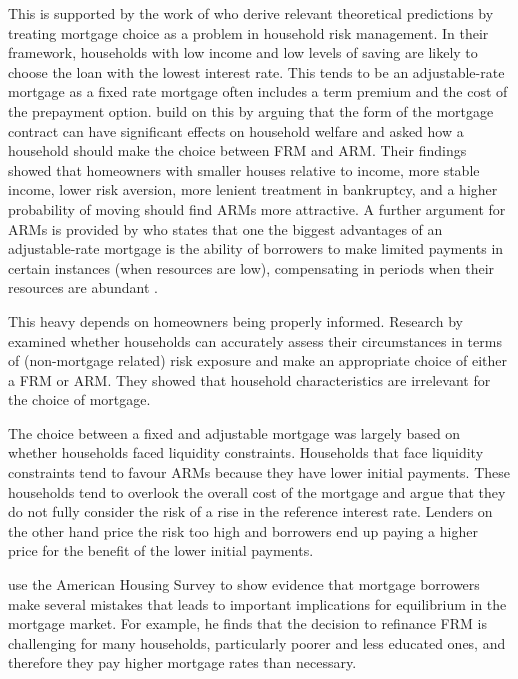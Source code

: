 \documentclass[
  letterpaper,
  DIV=11,
  numbers=noendperiod]{scrartcl}
\begin{document}
This is supported by the work of \citet{campbell2003household} who
derive relevant theoretical predictions by treating mortgage choice as a
problem in household risk management. In their framework, households
with low income and low levels of saving are likely to choose the loan
with the lowest interest rate. This tends to be an adjustable-rate
mortgage as a fixed rate mortgage often includes a term premium and the
cost of the prepayment option. \citet{campbell2003household} build on
this by arguing that the form of the mortgage contract can have
significant effects on household welfare and asked how a household
should make the choice between FRM and ARM. Their findings showed that
homeowners with smaller houses relative to income, more stable income,
lower risk aversion, more lenient treatment in bankruptcy, and a higher
probability of moving should find ARMs more attractive. A further
argument for ARMs is provided by \citet{cocco2013evidence} who states
that one the biggest advantages of an adjustable-rate mortgage is the
ability of borrowers to make limited payments in certain instances (when
resources are low), compensating in periods when their resources are
abundant \citep{cocco2013evidence}.

This heavy depends on homeowners being properly informed. Research by
\citet{paiella2007choosing} examined whether households can accurately
assess their circumstances in terms of (non-mortgage related) risk
exposure and make an appropriate choice of either a FRM or ARM. They
showed that household characteristics are irrelevant for the choice of
mortgage.

The choice between a fixed and adjustable mortgage was largely based on
whether households faced liquidity constraints. Households that face
liquidity constraints tend to favour ARMs because they have lower
initial payments. These households tend to overlook the overall cost of
the mortgage and \citet{paiella2007choosing} argue that they do not
fully consider the risk of a rise in the reference interest rate.
Lenders on the other hand price the risk too high and borrowers end up
paying a higher price for the benefit of the lower initial payments.

\citet{campbell2006household} use the American Housing Survey to show
evidence that mortgage borrowers make several mistakes that leads to
important implications for equilibrium in the mortgage market. For
example, he finds that the decision to refinance FRM is challenging for
many households, particularly poorer and less educated ones, and
therefore they pay higher mortgage rates than necessary.
\end{document}
